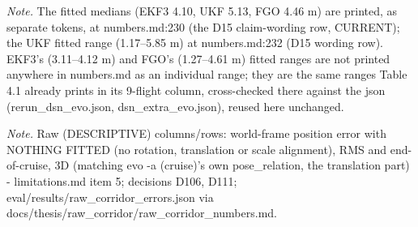 \begin{table}[htbp]
\textit{Note.} The fitted medians (EKF3 4.10, UKF 5.13, FGO 4.46 m) are printed, as separate tokens, at numbers.md:230 (the D15 claim-wording row, CURRENT); the UKF fitted range (1.17--5.85 m) at numbers.md:232 (D15 wording row). EKF3's (3.11--4.12 m) and FGO's (1.27--4.61 m) fitted ranges are not printed anywhere in numbers.md as an individual range; they are the same ranges Table 4.1 already prints in its 9-flight column, cross-checked there against the json (rerun\_dsn\_evo.json, dsn\_extra\_evo.json), reused here unchanged.\par
\textit{Note.} Raw (DESCRIPTIVE) columns/rows: world-frame position error with NOTHING FITTED (no rotation, translation or scale alignment), RMS and end-of-cruise, 3D (matching evo -a (cruise)'s own pose\_relation, the translation part) - limitations.md item 5; decisions D106, D111; eval/results/raw\_corridor\_errors.json via docs/thesis/raw\_corridor/raw\_corridor\_numbers.md.\par
\end{table}
